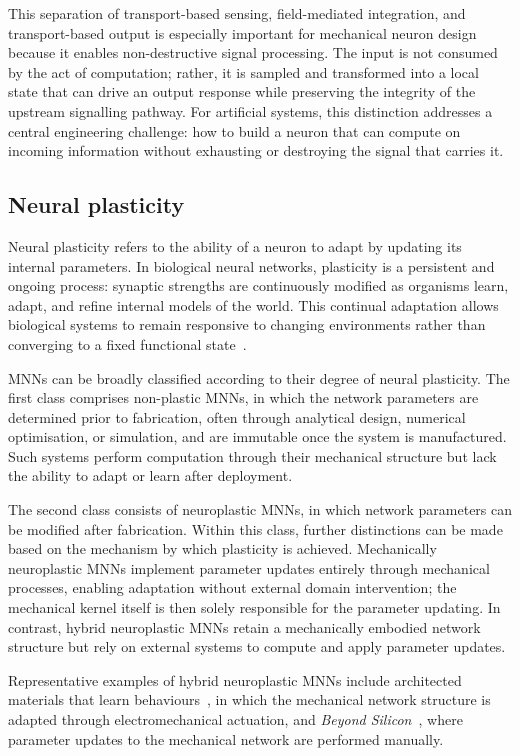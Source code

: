 \documentclass[11pt,a4paper]{article}
\numberwithin{equation}{section}
\begin{document}
This separation of transport-based sensing, field-mediated integration, and transport-based output is especially
important for mechanical neuron design because it enables non-destructive signal processing. The input is not
consumed by the act of computation; rather, it is sampled and transformed into a local state that can drive an
output response while preserving the integrity of the upstream signalling pathway. For artificial systems, this
distinction addresses a central engineering challenge: how to build a neuron that can compute on incoming
information without exhausting or destroying the signal that carries it.

\subsection{Neural plasticity}

Neural plasticity refers to the ability of a neuron to adapt by updating its internal parameters. In biological
neural networks, plasticity is a persistent and ongoing process: synaptic strengths are continuously modified as
organisms learn, adapt, and refine internal models of the world. This continual adaptation allows biological
systems to remain responsive to changing environments rather than converging to a fixed functional
state~\cite{demarin2014,mundkur2005}.

MNNs can be broadly classified according to their degree of neural plasticity. The first class comprises non-plastic
MNNs, in which the network parameters are determined prior to fabrication, often through analytical design,
numerical optimisation, or simulation, and are immutable once the system is manufactured. Such systems perform
computation through their mechanical structure but lack the ability to adapt or learn after deployment.

The second class consists of neuroplastic MNNs, in which network parameters can be modified after fabrication.
Within this class, further distinctions can be made based on the mechanism by which plasticity is achieved.
Mechanically neuroplastic MNNs implement parameter updates entirely through mechanical processes, enabling
adaptation without external domain intervention; the mechanical kernel itself is then solely responsible for the
parameter updating. In contrast, hybrid neuroplastic MNNs retain a mechanically embodied network structure but rely
on external systems to compute and apply parameter updates.

Representative examples of hybrid neuroplastic MNNs include architected materials that learn
behaviours~\cite{lee2022}, in which the mechanical network structure is adapted through electromechanical actuation,
and \emph{Beyond Silicon}~\cite{vanvuuren2025}, where parameter updates to the mechanical network are performed
manually.
\end{document}
